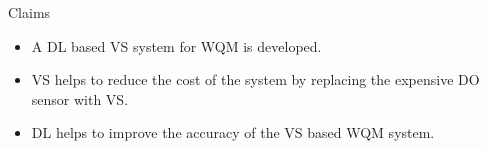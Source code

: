 \begin{frame}[allowframebreaks]{Claims}
\begin{itemize}
	\item A DL based VS system for WQM is developed.
	\item VS helps to reduce the cost of the system by replacing the expensive DO sensor with VS.
	\item DL helps to improve the accuracy of the VS based WQM system.
\end{itemize}
\end{frame}